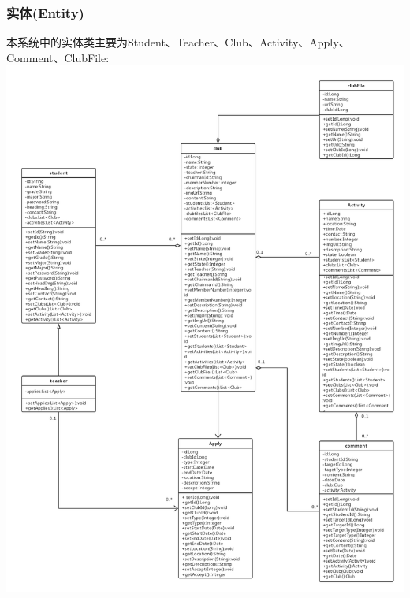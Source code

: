 \documentclass[UTF8]{ctexart}
\begin{document}
\subsubsection{实体(Entity)}
本系统中的实体类主要为Student、Teacher、Club、Activity、Apply、Comment、ClubFile:
\includegraphics[width = 1.0\textwidth]{xianhuo-class.png}
\end{document}
